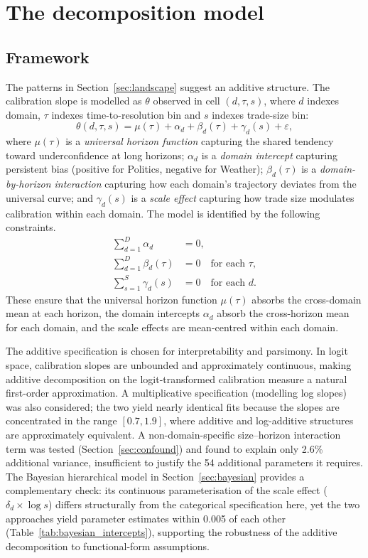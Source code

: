 \documentclass[numsec,webpdf,modern,medium]{oup-authoring-template}
\theoremstyle{thmstyleone}%
\theoremstyle{thmstyletwo}%
\theoremstyle{thmstylethree}%
\begin{document}
\section{The decomposition model}\label{sec:decomposition}

\subsection{Framework}\label{sec:framework}

The patterns in Section~\ref{sec:landscape} suggest an additive structure. The calibration slope is modelled as $\theta$ observed in cell $(d, \tau, s)$, where $d$ indexes domain, $\tau$ indexes time-to-resolution bin and $s$ indexes trade-size bin:
\begin{equation}\label{eq:decomp}
\theta(d, \tau, s) = \mu(\tau) + \alpha_d + \beta_d(\tau) + \gamma_d(s) + \varepsilon,
\end{equation}
where $\mu(\tau)$ is a \emph{universal horizon function} capturing the shared tendency toward underconfidence at long horizons; $\alpha_d$ is a \emph{domain intercept} capturing persistent bias (positive for Politics, negative for Weather); $\beta_d(\tau)$ is a \emph{domain-by-horizon interaction} capturing how each domain's trajectory deviates from the universal curve; and $\gamma_d(s)$ is a \emph{scale effect} capturing how trade size modulates calibration within each domain. The model is identified by the following constraints.
\begin{align}
\sum_{d=1}^{D} \alpha_d &= 0, \label{eq:id1}\\
\sum_{d=1}^{D} \beta_d(\tau) &= 0 \quad \text{for each } \tau, \label{eq:id2}\\
\sum_{s=1}^{S} \gamma_d(s) &= 0 \quad \text{for each } d. \label{eq:id3}
\end{align}
These ensure that the universal horizon function $\mu(\tau)$ absorbs the cross-domain mean at each horizon, the domain intercepts $\alpha_d$ absorb the cross-horizon mean for each domain, and the scale effects are mean-centred within each domain.

The additive specification is chosen for interpretability and parsimony. In logit space, calibration slopes are unbounded and approximately continuous, making additive decomposition on the logit-transformed calibration measure a natural first-order approximation. A multiplicative specification (modelling log slopes) was also considered; the two yield nearly identical fits because the slopes are concentrated in the range $[0.7, 1.9]$, where additive and log-additive structures are approximately equivalent. A non-domain-specific size--horizon interaction term was tested (Section~\ref{sec:confound}) and found to explain only 2.6\% additional variance, insufficient to justify the 54 additional parameters it requires. The Bayesian hierarchical model in Section~\ref{sec:bayesian} provides a complementary check: its continuous parameterisation of the scale effect ($\delta_d \times \log s$) differs structurally from the categorical specification here, yet the two approaches yield parameter estimates within 0.005 of each other (Table~\ref{tab:bayesian_intercepts}), supporting the robustness of the additive decomposition to functional-form assumptions.
\end{document}
